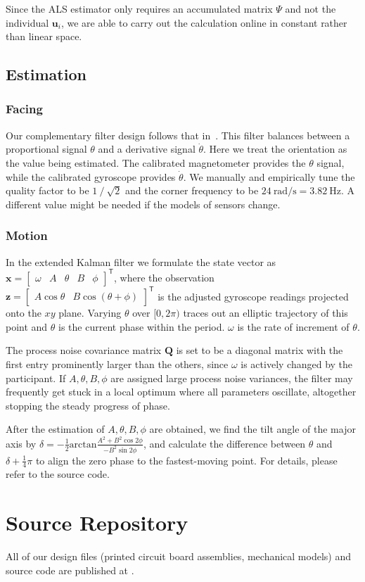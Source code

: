 \documentclass{nime-alternate} %
\begin{document}
Since the ALS estimator only requires an accumulated matrix $\Psi$ and not the individual $\mathbf{u}_i$, we are able to carry out the calculation online in constant rather than linear space.

\subsection{Estimation}
\subsubsection{Facing}
Our complementary filter design follows that in~\cite{Min_Complementary}. This filter balances between a proportional signal $\theta$ and a derivative signal $\dot\theta$. Here we treat the orientation as the value being estimated. The calibrated magnetometer provides the $\theta$ signal, while the calibrated gyroscope provides $\dot\theta$. We manually and empirically tune the quality factor to be $1 \mathbin{\mathop{/}} \sqrt{2}$ and the corner frequency to be $24\ \text{rad/s} = 3.82\ \text{Hz}$. A different value might be needed if the models of sensors change.

\subsubsection{Motion}
In the extended Kalman filter we formulate the state vector as $\mathbf{x} = \begin{bmatrix} \omega & A & \theta & B & \phi \end{bmatrix}^\mathsf{T}$, where the observation $\mathbf{z} = \begin{bmatrix} A \cos \theta & B \cos (\theta + \phi) \end{bmatrix}^\mathsf{T}$ is the adjusted gyroscope readings projected onto the $xy$ plane. Varying $\theta$ over $[0, 2\pi)$ traces out an elliptic trajectory of this point and $\theta$ is the current phase within the period. $\omega$ is the rate of increment of $\theta$.

The process noise covariance matrix $\mathbf{Q}$ is set to be a diagonal matrix with the first entry prominently larger than the others, since $\omega$ is actively changed by the participant. If $A, \theta, B, \phi$ are assigned large process noise variances, the filter may frequently get stuck in a local optimum where all parameters oscillate, altogether stopping the steady progress of phase.

After the estimation of $A, \theta, B, \phi$ are obtained, we find the tilt angle of the major axis by $\delta = -\frac 1 2 \mathrm{arctan} \frac {A^2 + B^2 \cos 2\phi} {-B^2 \sin 2\phi}$, and calculate the difference between $\theta$ and $\delta + \frac 1 4 \pi$ to align the zero phase to the fastest-moving point. For details, please refer to the source code.

\section{Source Repository}
All of our design files (printed circuit board assemblies, mechanical models) and source code are published at \newline {}.
\end{document}
